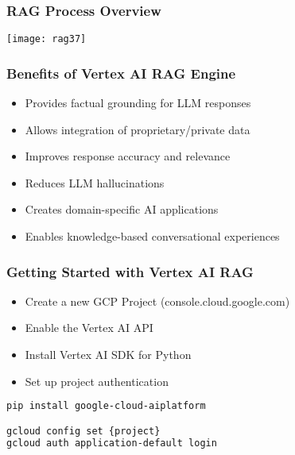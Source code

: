 \begin{frame}[fragile]\frametitle{RAG Process Overview}

\begin{center}
\texttt{[image: rag37]}
\end{center}	
\end{frame}


\begin{frame}[fragile]\frametitle{Benefits of Vertex AI RAG Engine}
      \begin{itemize}
        \item Provides factual grounding for LLM responses
        \item Allows integration of proprietary/private data
        \item Improves response accuracy and relevance
        \item Reduces LLM hallucinations
        \item Creates domain-specific AI applications
        \item Enables knowledge-based conversational experiences
      \end{itemize}
\end{frame}


\begin{frame}[fragile]\frametitle{Getting Started with Vertex AI RAG}
      \begin{itemize}
        \item Create a new GCP Project (console.cloud.google.com)
        \item Enable the Vertex AI API
        \item Install Vertex AI SDK for Python
        \item Set up project authentication
      \end{itemize}
	  
\begin{lstlisting}[language=bash]
pip install google-cloud-aiplatform

gcloud config set {project}
gcloud auth application-default login
\end{lstlisting}	  
\end{frame}


